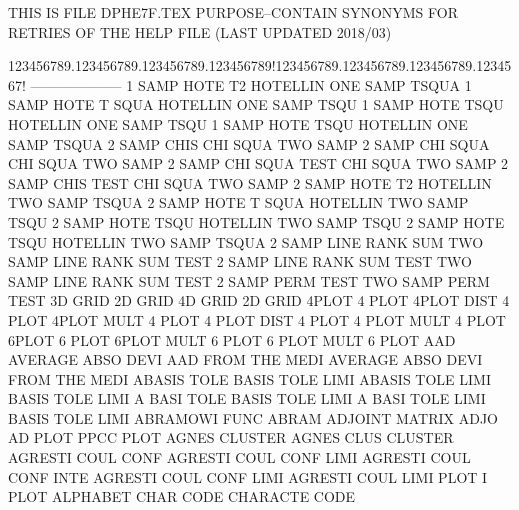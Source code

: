 THIS IS FILE DPHE7F.TEX
PURPOSE--CONTAIN SYNONYMS FOR RETRIES OF THE HELP FILE (LAST UPDATED 2018/03)
 
123456789.123456789.123456789.123456789!123456789.123456789.123456789.1234567!
--------------------
1        SAMP HOTE T2                   HOTELLIN ONE  SAMP TSQUA
1        SAMP HOTE T    SQUA            HOTELLIN ONE  SAMP TSQU
1        SAMP HOTE TSQU                 HOTELLIN ONE  SAMP TSQU
1        SAMP HOTE TSQU                 HOTELLIN ONE  SAMP TSQUA
2        SAMP CHIS                      CHI      SQUA TWO  SAMP
2        SAMP CHI  SQUA                 CHI      SQUA TWO  SAMP
2        SAMP CHI  SQUA TEST            CHI      SQUA TWO  SAMP
2        SAMP CHIS TEST                 CHI      SQUA TWO  SAMP
2        SAMP HOTE T2                   HOTELLIN TWO  SAMP TSQUA
2        SAMP HOTE T    SQUA            HOTELLIN TWO  SAMP TSQU
2        SAMP HOTE TSQU                 HOTELLIN TWO  SAMP TSQU
2        SAMP HOTE TSQU                 HOTELLIN TWO  SAMP TSQUA
2        SAMP LINE RANK SUM             TWO      SAMP LINE RANK SUM TEST
2        SAMP LINE RANK SUM  TEST       TWO      SAMP LINE RANK SUM TEST
2        SAMP PERM TEST                 TWO      SAMP PERM TEST
3D       GRID                           2D       GRID
4D       GRID                           2D       GRID
4PLOT                                   4        PLOT
4PLOT    DIST                           4        PLOT
4PLOT    MULT                           4        PLOT
4        PLOT DIST                      4        PLOT
4        PLOT MULT                      4        PLOT
6PLOT                                   6        PLOT
6PLOT    MULT                           6        PLOT
6        PLOT MULT                      6        PLOT
AAD                                     AVERAGE  ABSO DEVI
AAD      FROM THE  MEDI                 AVERAGE  ABSO DEVI FROM THE  MEDI
ABASIS   TOLE                           BASIS    TOLE LIMI
ABASIS   TOLE LIMI                      BASIS    TOLE LIMI
A        BASI TOLE                      BASIS    TOLE LIMI
A        BASI TOLE LIMI                 BASIS    TOLE LIMI
ABRAMOWI FUNC                           ABRAM
ADJOINT                                 MATRIX   ADJO
AD       PLOT                           PPCC     PLOT
AGNES                                   CLUSTER
AGNES    CLUS                           CLUSTER
AGRESTI  COUL CONF                      AGRESTI  COUL CONF LIMI
AGRESTI  COUL CONF INTE                 AGRESTI  COUL CONF LIMI
AGRESTI  COUL LIMI PLOT                 I        PLOT
ALPHABET CHAR CODE                      CHARACTE CODE
